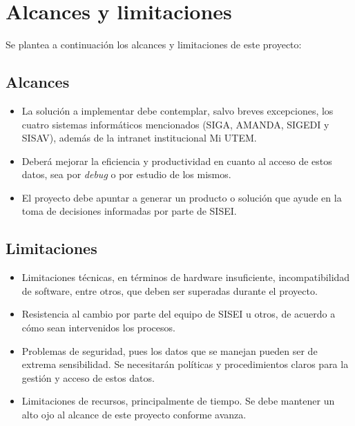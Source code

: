 \clearpage

\section{Alcances y limitaciones}

Se plantea a continuación los alcances y limitaciones de este proyecto:

\subsection{Alcances}

\begin{itemize}
	\item La solución a implementar debe contemplar, salvo breves excepciones, los cuatro sistemas informáticos mencionados (SIGA, AMANDA, SIGEDI y SISAV), además de la intranet institucional Mi UTEM.
	\item Deberá mejorar la eficiencia y productividad en cuanto al acceso de estos datos, sea por \textit{debug} o por estudio de los mismos.
	\item El proyecto debe apuntar a generar un producto o solución que ayude en la toma de decisiones informadas por parte de SISEI.
\end{itemize}

\subsection{Limitaciones}
\begin{itemize}
	\item Limitaciones técnicas, en términos de hardware insuficiente, incompatibilidad de software, entre otros, que deben ser superadas durante el proyecto.
	\item Resistencia al cambio por parte del equipo de SISEI u otros, de acuerdo a cómo sean intervenidos los procesos.
	\item Problemas de seguridad, pues los datos que se manejan pueden ser de extrema sensibilidad. Se necesitarán políticas y procedimientos claros para la gestión y acceso de estos datos.
	\item Limitaciones de recursos, principalmente de tiempo. Se debe mantener un alto ojo al alcance de este proyecto conforme avanza.
\end{itemize}

\clearpage
